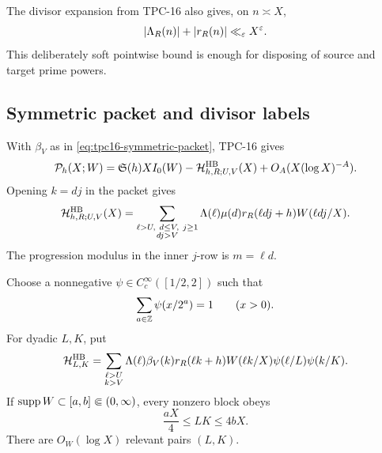 The divisor expansion from TPC-16 also gives, on $n\asymp X$,
\begin{equation}
 |\Lambda_R(n)|+|r_R(n)|\ll_\varepsilon X^\varepsilon.
 \label{eq:pointwise-residual}
\end{equation}
This deliberately soft pointwise bound is enough for disposing of source
and target prime powers.

\subsection{Symmetric packet and divisor labels}

With $\beta_V$ as in \eqref{eq:tpc16-symmetric-packet}, TPC-16 gives
\begin{equation}
 \mathcal P_h(X;W)
 =\mathfrak S(h)XI_0(W)
 -\mathcal H^{\mathrm{HB}}_{h,R;U,V}(X)
 +O_A(X(\log X)^{-A}).
 \label{eq:symmetric-normal-form}
\end{equation}
Opening $k=dj$ in the packet gives
\begin{equation}
 \mathcal H^{\mathrm{HB}}_{h,R;U,V}(X)
 =
 \sum_{\substack{\ell>U,\ d\le V,\ j\ge1\\dj>V}}
 \Lambda(\ell)\mu(d)r_R(\ell dj+h)W(\ell dj/X).
 \label{eq:opened-symmetric-packet}
\end{equation}
The progression modulus in the inner $j$-row is $m=\ell d$.

Choose a nonnegative $\psi\in C_c^\infty([1/2,2])$ such that
\begin{equation}
 \sum_{a\in\mathbb Z}\psi(x/2^a)=1
 \qquad(x>0).
 \label{eq:dyadic-partition}
\end{equation}
For dyadic $L,K$, put
\begin{equation}
 \mathcal H^{\mathrm{HB}}_{L,K}
 =
 \sum_{\substack{\ell>U\\k>V}}
 \Lambda(\ell)\beta_V(k)r_R(\ell k+h)W(\ell k/X)
 \psi(\ell/L)\psi(k/K).
 \label{eq:hb-dyadic-block}
\end{equation}
If $\operatorname{supp} W\subset[a,b]\Subset(0,\infty)$, every nonzero block obeys
\begin{equation}
 \frac{aX}{4}\le LK\le4bX.
 \label{eq:product-ledger}
\end{equation}
There are $O_W(\log X)$ relevant pairs $(L,K)$.

